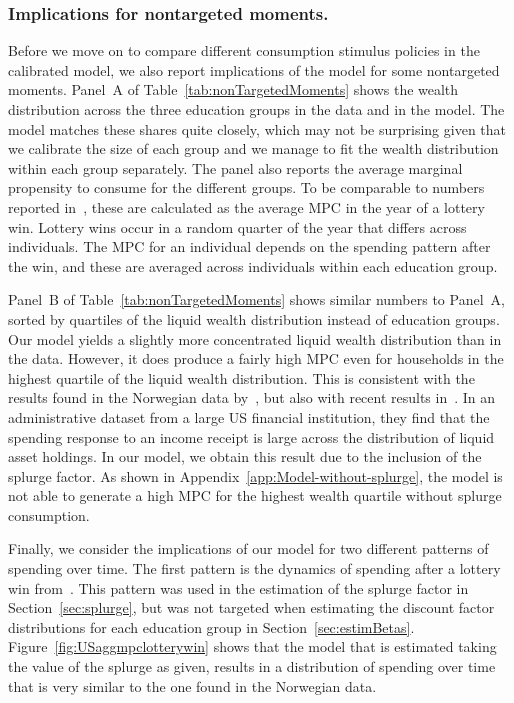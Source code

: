 \documentclass{econsocart}
\begin{document}
\subsubsection{Implications for nontargeted moments.}\whenintegrated{\label{nontargeted-moments}}
\whenintegrated{\label{sec:nonTargetedMoments}}

Before we move on to compare different consumption stimulus policies in the calibrated model, we also report implications of the model for some nontargeted moments.
Panel~A of Table~\ref{tab:nonTargetedMoments} shows the wealth distribution across the three education groups in the data and in the model.
The model matches these shares quite closely, which may not be surprising given that we calibrate the size of each group and we manage to fit the wealth distribution within each group separately.
The panel also reports the average marginal propensity to consume for the different groups.
To be comparable to numbers reported in~\cite{fagereng-mpc-2021}, these are calculated as the average MPC in the year of a lottery win.
Lottery wins occur in a random quarter of the year that differs across individuals.
The MPC for an individual depends on the spending pattern after the win, and these are averaged across individuals within each education group.

Panel~B of Table~\ref{tab:nonTargetedMoments} shows similar numbers to Panel~A, sorted by quartiles of the liquid wealth distribution instead of education groups.
Our model yields a slightly more concentrated liquid wealth distribution than in the data.
However, it does produce a fairly high MPC even for households in the highest quartile of the liquid wealth distribution.
This is consistent with the results found in the Norwegian data by~\cite{fagereng-mpc-2021}, but also with recent results in~\cite{graham2026mental}.
In an administrative dataset from a large US financial institution, they find that the spending response to an income receipt is large across the distribution of liquid asset holdings.
In our model, we obtain this result due to the inclusion of the splurge factor.
As shown in Appendix~\ref{app:Model-without-splurge}, the model is not able to generate a high MPC for the highest wealth quartile without splurge consumption.


Finally, we consider the implications of our model for two different patterns of spending over time.
The first pattern is the dynamics of spending after a lottery win from~\citeauthor{fagereng-mpc-2021}.
This pattern was used in the estimation of the splurge factor in Section~\ref{sec:splurge}, but was not targeted when estimating the discount factor distributions for each education group in Section~\ref{sec:estimBetas}.
Figure~\ref{fig:USaggmpclotterywin} shows that the model that is estimated taking the value of the splurge as given, results in a distribution of spending over time that is very similar to the one found in the Norwegian data.
\end{document}
